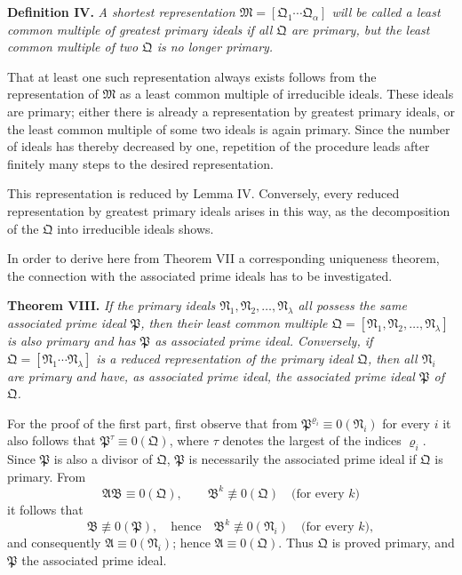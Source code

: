 \documentclass[11pt]{article}
\providecommand{\ideal}[1]{\mathfrak{#1}}
\begin{document}
\textbf{Definition IV.} \emph{A shortest representation $\ideal M=[\ideal Q_1\cdots\ideal Q_\alpha]$ will be called a least common multiple of greatest primary ideals if all $\ideal Q$ are primary, but the least common multiple of two $\ideal Q$ is no longer primary.}

That at least one such representation always exists follows from the representation of $\ideal M$ as a least common multiple of irreducible ideals. These ideals are primary; either there is already a representation by greatest primary ideals, or the least common multiple of some two ideals is again primary. Since the number of ideals has thereby decreased by one, repetition of the procedure leads after finitely many steps to the desired representation.

This representation is reduced by Lemma IV. Conversely, every reduced representation by greatest primary ideals arises in this way, as the decomposition of the $\ideal Q$ into irreducible ideals shows.

In order to derive here from Theorem VII a corresponding uniqueness theorem, the connection with the associated prime ideals has to be investigated.

\textbf{Theorem VIII.} \emph{If the primary ideals $\ideal N_1,\ideal N_2,\ldots,\ideal N_\lambda$ all possess the same associated prime ideal $\ideal P$, then their least common multiple $\ideal Q=[\ideal N_1,\ideal N_2,\ldots,\ideal N_\lambda]$ is also primary and has $\ideal P$ as associated prime ideal. Conversely, if $\ideal Q=[\ideal N_1\cdots\ideal N_\lambda]$ is a reduced representation of the primary ideal $\ideal Q$, then all $\ideal N_i$ are primary and have, as associated prime ideal, the associated prime ideal $\ideal P$ of $\ideal Q$.}

For the proof of the first part, first observe that from $\ideal P^{\varrho_i}\equiv0(\ideal N_i)$ for every $i$ it also follows that $\ideal P^\tau\equiv0(\ideal Q)$, where $\tau$ denotes the largest of the indices $\varrho_i$. Since $\ideal P$ is also a divisor of $\ideal Q$, $\ideal P$ is necessarily the associated prime ideal if $\ideal Q$ is primary. From
\[
 \ideal A\ideal B\equiv0(\ideal Q),
 \qquad
 \ideal B^k\not\equiv0(\ideal Q)\quad\text{(for every }k)
\]
it follows that
\[
 \ideal B\not\equiv0(\ideal P),
 \quad\text{hence}\quad
 \ideal B^k\not\equiv0(\ideal N_i)\quad\text{(for every }k),
\]
and consequently $\ideal A\equiv0(\ideal N_i)$; hence $\ideal A\equiv0(\ideal Q)$. Thus $\ideal Q$ is proved primary, and $\ideal P$ the associated prime ideal.
\end{document}
